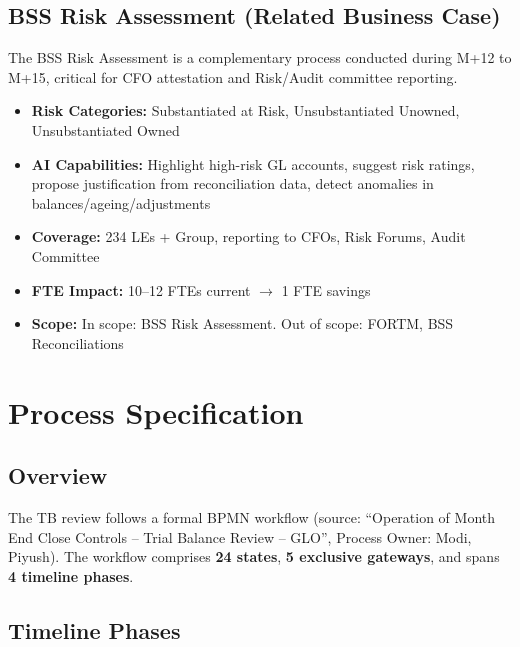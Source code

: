 \documentclass[11pt,a4paper]{article}
\begin{document}
\subsection{BSS Risk Assessment (Related Business Case)}

The BSS Risk Assessment is a complementary process conducted during M+12 to M+15, critical for
CFO attestation and Risk/Audit committee reporting.

\begin{itemize}[nosep]
    \item \textbf{Risk Categories:} Substantiated at Risk, Unsubstantiated Unowned, Unsubstantiated Owned
    \item \textbf{AI Capabilities:} Highlight high-risk GL accounts, suggest risk ratings, propose justification from reconciliation data, detect anomalies in balances/ageing/adjustments
    \item \textbf{Coverage:} 234 LEs + Group, reporting to CFOs, Risk Forums, Audit Committee
    \item \textbf{FTE Impact:} 10--12 FTEs current $\rightarrow$ 1 FTE savings
    \item \textbf{Scope:} In scope: BSS Risk Assessment. Out of scope: FORTM, BSS Reconciliations
\end{itemize}

\newpage
\section{Process Specification}
\label{sec:process}

\subsection{Overview}

The TB review follows a formal BPMN workflow (source: ``Operation of Month End Close Controls -- Trial Balance Review -- GLO'', Process Owner: Modi, Piyush). The workflow comprises \textbf{24 states}, \textbf{5 exclusive gateways}, and spans \textbf{4 timeline phases}.

\subsection{Timeline Phases}
\end{document}
